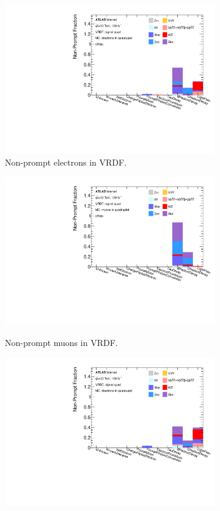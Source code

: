 \begin{figure}[htb]
    \centering
    \begin{subfigure}{.48\textwidth}
        \centering
        \includegraphics[width=.9\linewidth]{figures/Analysis/Background/NonPromptCRDFSignal_Electronss_bVeto.pdf}
        \caption{Non-prompt electrons in VRDF.}
    \end{subfigure}
    \begin{subfigure}{.48\textwidth}
        \centering
        \includegraphics[width=.9\linewidth]{figures/Analysis/Background/NonPromptCRDFSignal_Muons_bVeto.pdf}\\
        \caption{Non-prompt muons in VRDF.}
    \end{subfigure}
    \begin{subfigure}{.48\textwidth}
        \centering
        \includegraphics[width=.9\linewidth]{figures/Analysis/Background/NonPromptCRSCSignal_Electrons_.pdf}

\end{subfigure}
\end{figure}
